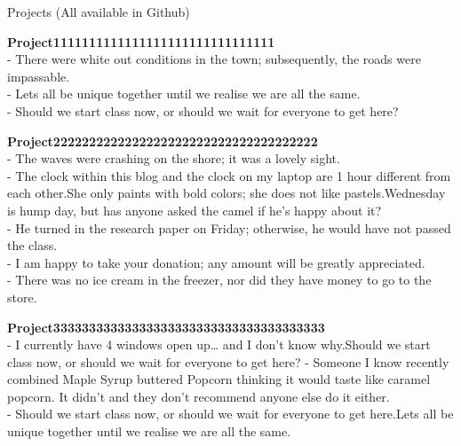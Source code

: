 \documentclass{resume} %
\begin{document}
\begin{rSection}{Projects (All available in Github)}

{\bf Project1111111111111111111111111111111}
\\- There were white out conditions in the town; subsequently, the roads were impassable.
\\- Lets all be unique together until we realise we are all the same.
\\- Should we start class now, or should we wait for everyone to get here?

{\bf Project2222222222222222222222222222222222222}
\\- The waves were crashing on the shore; it was a lovely sight.
\\- The clock within this blog and the clock on my laptop are 1 hour different from each other.She only paints with bold colors; she does not like pastels.Wednesday is hump day, but has anyone asked the camel if he’s happy about it?
\\- He turned in the research paper on Friday; otherwise, he would have not passed the class.
\\- I am happy to take your donation; any amount will be greatly appreciated.
\\- There was no ice cream in the freezer, nor did they have money to go to the store.

{\bf Project33333333333333333333333333333333333333}
\\- I currently have 4 windows open up… and I don’t know why.Should we start class now, or should we wait for everyone to get here?
- Someone I know recently combined Maple Syrup  buttered Popcorn thinking it would taste like caramel popcorn. It didn’t and they don’t recommend anyone else do it either.
\\- Should we start class now, or should we wait for everyone to get here.Lets all be unique together until we realise we are all the same.



\end{rSection}
\end{document}
